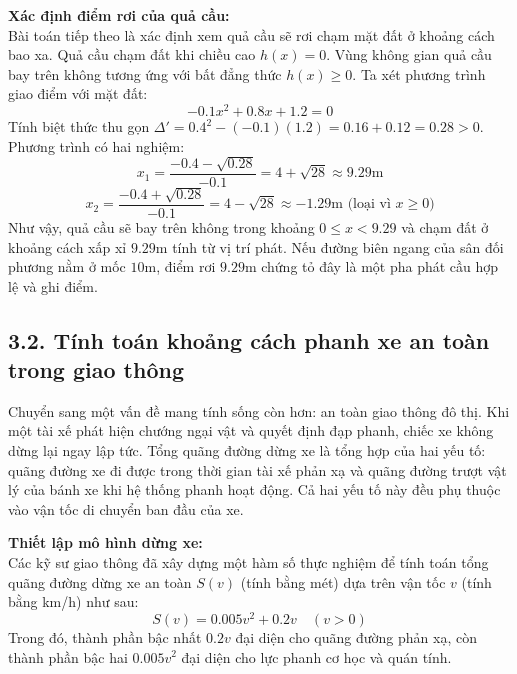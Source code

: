 \documentclass[14pt, a4paper, oneside]{extreport}
\begin{document}
\textbf{Xác định điểm rơi của quả cầu:} \\
Bài toán tiếp theo là xác định xem quả cầu sẽ rơi chạm mặt đất ở khoảng cách bao xa. Quả cầu chạm đất khi chiều cao $h(x) = 0$. Vùng không gian quả cầu bay trên không tương ứng với bất đẳng thức $h(x) \ge 0$. Ta xét phương trình giao điểm với mặt đất:
\[ -0.1x^2 + 0.8x + 1.2 = 0 \]
Tính biệt thức thu gọn $\Delta' = 0.4^2 - (-0.1)(1.2) = 0.16 + 0.12 = 0.28 > 0$. Phương trình có hai nghiệm:
\[ x_1 = \frac{-0.4 - \sqrt{0.28}}{-0.1} = 4 + \sqrt{28} \approx 9.29\text{m} \]
\[ x_2 = \frac{-0.4 + \sqrt{0.28}}{-0.1} = 4 - \sqrt{28} \approx -1.29\text{m} \text{ (loại vì } x \ge 0) \]
Như vậy, quả cầu sẽ bay trên không trong khoảng $0 \le x < 9.29$ và chạm đất ở khoảng cách xấp xỉ $9.29\text{m}$ tính từ vị trí phát. Nếu đường biên ngang của sân đối phương nằm ở mốc $10\text{m}$, điểm rơi $9.29\text{m}$ chứng tỏ đây là một pha phát cầu hợp lệ và ghi điểm.

\subsection*{3.2. Tính toán khoảng cách phanh xe an toàn trong giao thông}

Chuyển sang một vấn đề mang tính sống còn hơn: an toàn giao thông đô thị. Khi một tài xế phát hiện chướng ngại vật và quyết định đạp phanh, chiếc xe không dừng lại ngay lập tức. Tổng quãng đường dừng xe là tổng hợp của hai yếu tố: quãng đường xe đi được trong thời gian tài xế phản xạ và quãng đường trượt vật lý của bánh xe khi hệ thống phanh hoạt động. Cả hai yếu tố này đều phụ thuộc vào vận tốc di chuyển ban đầu của xe.

\textbf{Thiết lập mô hình dừng xe:} \\
Các kỹ sư giao thông đã xây dựng một hàm số thực nghiệm để tính toán tổng quãng đường dừng xe an toàn $S(v)$ (tính bằng mét) dựa trên vận tốc $v$ (tính bằng km/h) như sau:
\[ S(v) = 0.005v^2 + 0.2v \quad (v > 0) \]
Trong đó, thành phần bậc nhất $0.2v$ đại diện cho quãng đường phản xạ, còn thành phần bậc hai $0.005v^2$ đại diện cho lực phanh cơ học và quán tính.
\end{document}
